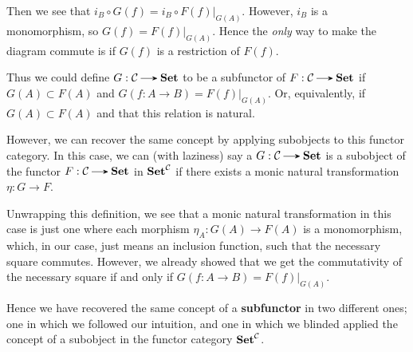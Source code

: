 \begin{example}
    \begin{center}
        \hspace{1cm}
    \end{center}    
    Then we see that $i_B \circ G(f) = i_B \circ F(f)\big|_{G(A)}$. However, 
    $i_B$ is a monomorphism,  so $G(f) = F(f)\big|_{G(A)}$. Hence the \emph{only} way to 
    make the diagram commute is if $G(f)$ is a restriction of $F(f)$. 

    Thus we could define $G: \cc \to \textbf{Set}$ to be a subfunctor of $F: \cc \to \textbf{Set}$ 
    if $G(A) \subset F(A)$ and $G(f: A \to B) = F(f)\big|_{G(A)}$. Or, equivalently, 
    if $G(A) \subset F(A)$ and that this relation is natural. 

    However, we can recover the same concept by applying subobjects to this functor category. 
    In this case, we can (with laziness) say a $G: \cc \to \textbf{Set}$ is a subobject 
    of the functor $F: \cc \to \textbf{Set}$ 
    in $\textbf{Set}^{\mathcal{C}}$ if there exists a monic natural transformation 
    $\eta: G \to F$. 

    Unwrapping this definition, we see that a monic natural transformation in this 
    case is just one where each morphism $\eta_A: G(A) \to F(A)$ is a monomorphism, which, in our case, 
    just means an inclusion function, such that the necessary square commutes. However, we 
    already showed that we get the commutativity of the necessary square if and only if 
    $G(f: A \to B) = F(f)\big|_{G(A)}$. 
    
    Hence we have recovered the same concept of a \textbf{subfunctor} in two different ones; 
    one in which we followed our intuition, and one in which we blinded applied the concept of a 
    subobject in the functor category $\textbf{Set}^{\mathcal{C}}$.
\end{example}

